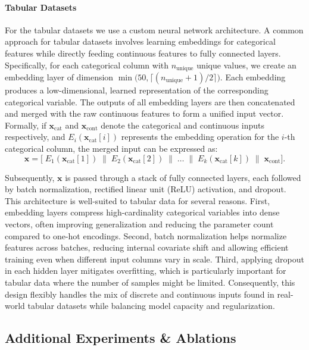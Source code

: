 \paragraph{Tabular Datasets} For the tabular datasets we use a custom neural network architecture. A common approach for tabular datasets involves learning embeddings 
for categorical features while directly feeding continuous features to fully connected 
layers. Specifically, for each categorical column with $n_\text{unique}$ unique values, 
we create an embedding layer of dimension 
$\min\bigl(50, \lceil (n_\text{unique} + 1)/2 \rceil \bigr)$.
Each embedding produces a low-dimensional, learned representation of the corresponding 
categorical variable. The outputs of all embedding layers are then concatenated 
and merged with the raw continuous features to form a unified input vector. 
Formally, if $\mathbf{x}_\text{cat}$ and $\mathbf{x}_\text{cont}$ denote the 
categorical and continuous inputs respectively, and $E_i(\mathbf{x}_\text{cat}[i])$ 
represents the embedding operation for the $i$-th categorical column, the merged input 
can be expressed as:
\begin{equation*}
    \mathbf{x} = \bigl[\; E_1(\mathbf{x}_\text{cat}[1]) \;\| \; E_2(\mathbf{x}_\text{cat}[2]) 
  \;\|\;\dots\;\|\;E_k(\mathbf{x}_\text{cat}[k]) \;\|\; \mathbf{x}_\text{cont} \bigr].
\end{equation*}
  

Subsequently, $\mathbf{x}$ is passed through a stack of fully connected layers, each 
followed by batch normalization, rectified linear unit (ReLU) activation, and dropout. This architecture is well-suited to tabular data for several reasons. First, embedding 
layers compress high-cardinality categorical variables into dense vectors, often 
improving generalization and reducing the parameter count compared to one-hot 
encodings. Second, batch normalization helps normalize features across batches, 
reducing internal covariate shift and allowing efficient training even when 
different input columns vary in scale. Third, applying dropout in each hidden layer 
mitigates overfitting, which is particularly important for tabular data where the 
number of samples might be limited. Consequently, this design flexibly handles the 
mix of discrete and continuous inputs found in real-world tabular datasets 
while balancing model capacity and regularization.

\subsection{Additional Experiments \& Ablations}
\label{app:add_exp_abl}


